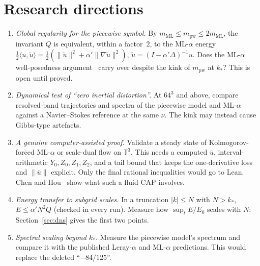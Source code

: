 \documentclass[11pt,a4paper]{article}
\theoremstyle{definition}
\begin{document}
\section{Research directions}
\label{sec:directions}
\begin{enumerate}
  \item \emph{Global regularity for the piecewise symbol.} By $m_{\mathrm{ML}}\le m_{\mathrm{pw}}\le2m_{\mathrm{ML}}$, the invariant $Q$ is equivalent, within a factor~$2$, to the ML-$\alpha$ energy $\tfrac12\langle u,\tilde u\rangle=\tfrac12(\|\tilde u\|^2+\alpha'\|\nabla\tilde u\|^2)$, $\tilde u=(I-\alpha'\Delta)^{-1}u$. Does the ML-$\alpha$ well-posedness argument~\cite{ILT2006} carry over despite the kink of $m_{\mathrm{pw}}$ at $k_*$? This is open until proved.
  \item \emph{Dynamical test of ``zero inertial distortion''.} At $64^3$ and above, compare resolved-band trajectories and spectra of the piecewise model and ML-$\alpha$ against a Navier--Stokes reference at the same $\nu$. The kink may instead cause Gibbs-type artefacts.
  \item \emph{A genuine computer-assisted proof.} Validate a steady state of Kolmogorov-forced ML-$\alpha$ or scale-dual flow on $\mathbb{T}^3$. This needs a computed $\bar u$, interval-arithmetic $Y_0,Z_0,Z_1,Z_2$, and a tail bound that keeps the one-derivative loss and $\|\bar u\|$ explicit. Only the final rational inequalities would go to Lean. Chen and Hou~\cite{ChenHou2022a,ChenHou2022b} show what such a fluid CAP involves.
  \item \emph{Energy transfer to subgrid scales.} In a truncation $|k|\le N$ with $N>k_*$, $E\le\alpha'N^2Q$ (checked in every run). Measure how $\sup_tE/E_0$ scales with $N$: Section~\ref{sec:dns} gives the first two points.
  \item \emph{Spectral scaling beyond $k_*$.} Measure the piecewise model's spectrum and compare it with the published Leray-$\alpha$ and ML-$\alpha$ predictions. This would replace the deleted ``$-84/125$''.
\end{enumerate}
\end{document}
